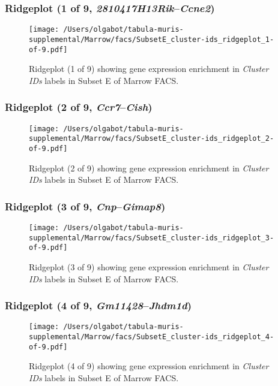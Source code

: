 \clearpage

\subsubsection{Ridgeplot (1 of 9, \emph{2810417H13Rik}--\emph{Ccne2})}
\begin{figure}[h]
\centering
\texttt{[image: /Users/olgabot/tabula-muris-supplemental/Marrow/facs/SubsetE\_cluster-ids\_ridgeplot\_1-of-9.pdf]}

\caption{ Ridgeplot (1 of 9)  showing gene expression enrichment in \emph{Cluster IDs} labels in Subset E of Marrow FACS. }
\end{figure}


\clearpage

\subsubsection{Ridgeplot (2 of 9, \emph{Ccr7}--\emph{Cish})}
\begin{figure}[h]
\centering
\texttt{[image: /Users/olgabot/tabula-muris-supplemental/Marrow/facs/SubsetE\_cluster-ids\_ridgeplot\_2-of-9.pdf]}

\caption{ Ridgeplot (2 of 9)  showing gene expression enrichment in \emph{Cluster IDs} labels in Subset E of Marrow FACS. }
\end{figure}


\clearpage

\subsubsection{Ridgeplot (3 of 9, \emph{Cnp}--\emph{Gimap8})}
\begin{figure}[h]
\centering
\texttt{[image: /Users/olgabot/tabula-muris-supplemental/Marrow/facs/SubsetE\_cluster-ids\_ridgeplot\_3-of-9.pdf]}

\caption{ Ridgeplot (3 of 9)  showing gene expression enrichment in \emph{Cluster IDs} labels in Subset E of Marrow FACS. }
\end{figure}


\clearpage

\subsubsection{Ridgeplot (4 of 9, \emph{Gm11428}--\emph{Jhdm1d})}
\begin{figure}[h]
\centering
\texttt{[image: /Users/olgabot/tabula-muris-supplemental/Marrow/facs/SubsetE\_cluster-ids\_ridgeplot\_4-of-9.pdf]}

\caption{ Ridgeplot (4 of 9)  showing gene expression enrichment in \emph{Cluster IDs} labels in Subset E of Marrow FACS. }
\end{figure}


